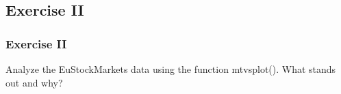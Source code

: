 


\subsection{Exercise II}
\begin{frame}
	\frametitle{Exercise II}
	Analyze the \ttfamily EuStockMarkets \normalfont data using the function \ttfamily mtvsplot()\normalfont.  What stands out and why?
\end{frame}